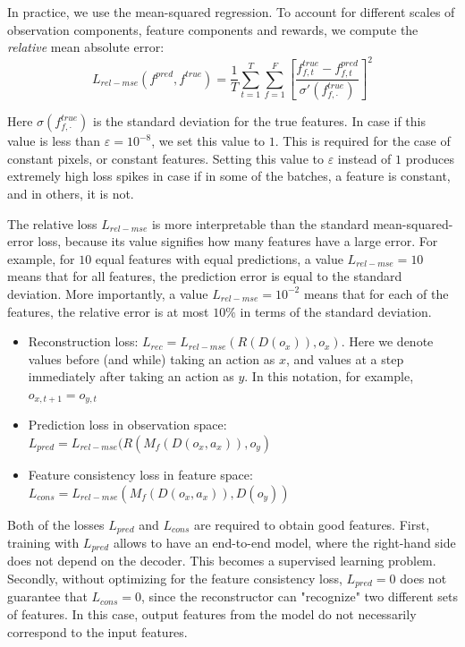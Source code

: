 \documentclass[a4paper,11pt,oneside]{report}
\begin{document}
In practice, we use the mean-squared regression. To account for different scales of observation components, feature components and rewards, we compute the {\em relative} mean absolute error:
$$
L_{rel-mse}(f^{pred}, f^{true})=\frac{1}{T}\sum\limits_{t=1}^T\sum\limits_{f=1}^F\left[\frac{f^{true}_{f,t}-f^{pred}_{f, t}}{\sigma'(f^{true}_{f, \cdot})}\right]^2
$$

Here $\sigma(f^{true}_{f, \cdot})$ is the standard deviation for the true features. In case if this value is less than $\varepsilon=10^{-8}$, we set this value to $1$. This is required for the case of constant pixels, or constant features. Setting this value to $\varepsilon$ instead of $1$ produces extremely high loss spikes in case if in some of the batches, a feature is constant, and in others, it is not.

The relative loss $L_{rel-mse}$ is more interpretable than the standard mean-squared-error loss, because its value signifies how many features have a large error. For example, for $10$ equal features with equal predictions, a value $L_{rel-mse}=10$ means that for all features, the prediction error is equal to the standard deviation. More importantly, a value $L_{rel-mse}=10^{-2}$ means that for each of the features, the relative error is at most $10\%$ in terms of the standard deviation.

\begin{itemize}
    \item Reconstruction loss: $L_{rec}=L_{rel-mse}(R(D(o_{x})), o_{x})$. Here we denote values before (and while) taking an action as $x$, and values at a step immediately after taking an action as $y$. In this notation, for example, $o_{x, t+1}=o_{y,t}$
    \item Prediction loss in observation space: $L_{pred}=L_{rel-mse}(R(M_f(D(o_{x}, a_{x})), o_{y})$
    \item Feature consistency loss in feature space: $L_{cons}=L_{rel-mse}(M_f(D(o_x, a_x)), D(o_y))$
\end{itemize}

Both of the losses $L_{pred}$ and $L_{cons}$ are required to obtain good features. First, training with $L_{pred}$ allows to have an end-to-end model, where the right-hand side does not depend on the decoder. This becomes a supervised learning problem. Secondly, without optimizing for the feature consistency loss, $L_{pred}=0$ does not guarantee that $L_{cons}=0$, since the reconstructor can "recognize" two different sets of features. In this case, output features from the model do not necessarily correspond to the input features.
\end{document}
